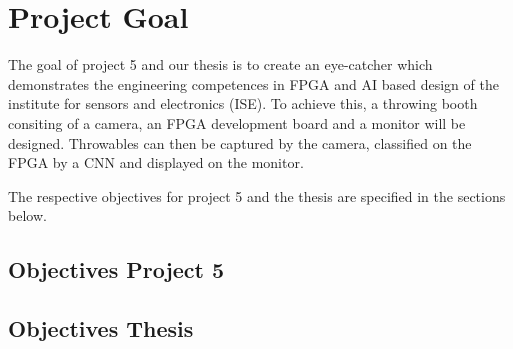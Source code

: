 \section{Project Goal}
\label{sec:project_goal}
The goal of project 5 and our thesis is to create an eye-catcher which demonstrates the engineering competences in FPGA and AI based design of the institute for sensors and electronics (ISE). To achieve this, a throwing booth consiting of a camera, an FPGA development board and a monitor will be designed. Throwables can then be captured by the camera, classified on the FPGA by a CNN and displayed on the monitor.

The respective objectives for project 5 and the thesis are specified in the sections below.

\subsection{Objectives Project 5}
\label{subsec:objectives_project_5}


\subsection{Objectives Thesis}
\label{subsec:objectives_thesis}

